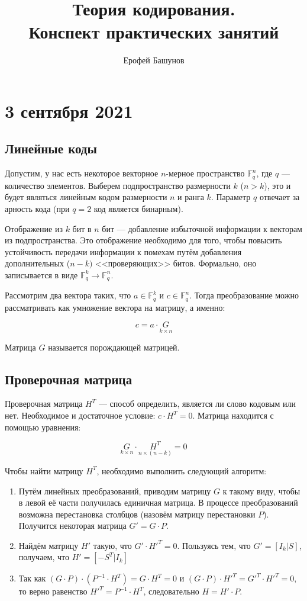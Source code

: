 \documentclass{article}
\title{Теория кодирования. \\ Конспект практических занятий}
\author{Ерофей Башунов}
\date{}
\begin{document}
\maketitle

\newpage
\section*{3 сентября 2021}

\subsection*{Линейные коды}

Допустим, у нас есть некоторое векторное $n$-мерное пространство $\mathbb{F}^n_q$, где $q$ --- количество элементов. Выберем подпространство размерности $k$ ($n > k$), это и будет являться линейным кодом размерности $n$ и ранга $k$. Параметр $q$ отвечает за арность кода (при $q = 2$ код является бинарным).

Отображение из $k$ бит в $n$ бит --- добавление избыточной информации к векторам из подпространства. Это отображение необходимо для того, чтобы повысить устойчивость передачи информации к помехам путём добавления дополнительных ($n - k)$ <<проверяющих>> битов. Формально, оно записывается в виде $\mathbb{F}^k_q \rightarrow \mathbb{F}^n_q$.

Рассмотрим два вектора таких, что $a \in \mathbb{F}^k_q $ и $c \in \mathbb{F}^n_q$. Тогда преобразование можно рассматривать как умножение вектора на матрицу, а именно:

$$c = a \cdot \underset{k \times n}{G}$$

Матрица $G$ называется порождающей матрицей.

\subsection*{Проверочная матрица}

Проверочная матрица $H^T$ --- способ определить, является ли слово кодовым или нет. Необходимое и достаточное условие: $c \cdot H^T = 0$. Матрица находится с помощью уравнения:

$$\underset{k \times n}{G} \cdot \underset{n \times (n - k)}{H^T} = 0$$

Чтобы найти матрицу $H^T$, необходимо выполнить следующий алгоритм:
\begin{enumerate}
    \item Путём линейных преобразований, приводим матрицу $G$ к такому виду, чтобы в левой её части получилась единичная матрица. В процессе преобразований возможна перестановка столбцов (назовём матрицу перестановки $P$). Получится некоторая матрица $G' = G \cdot P$.
    \item Найдём матрицу $H'$ такую, что $G' \cdot H'^T = 0$. Пользуясь тем, что $G' = [I_k | S]$, получаем, что $H' = [-S^T | I_k]$
    \item Так как $(G \cdot P) \cdot (P^{-1} \cdot H^T) = G \cdot H^T = 0$ и $(G \cdot P) \cdot H'^T = G'^T \cdot H'^T = 0$, то верно равенство $H'^T = P^{-1} \cdot H^T$, следовательно $H = H' \cdot P$.
\end{enumerate}
\end{document}
